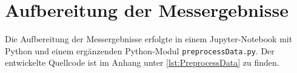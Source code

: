 \section{Aufbereitung der Messergebnisse}
\label{sec:Auswertung_Messeregbnisse}
Die Aufbereitung der Messergebnisse erfolgte in einem Jupyter-Notebook mit Python und einem ergänzenden Python-Modul \texttt{preprocessData.py}. Der entwickelte Quellcode ist im Anhang unter \cref{lst:PreprocessData} zu finden.



